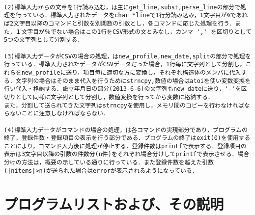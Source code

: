 \documentclass[a4j]{jarticle}
\begin{document}
\begin{verbatim}

(2)標準入力からの文章を1行読み込む，は主にget_line,subst,perse_lineの部分で処理を行っている．標準入力されたデータをchar *lineで1行分読み込み，1文字目が%であれば2文字目以降のコマンドと引数を別関数の引数とし，各コマンドに応じた処理を行う．また，１文字目が％でない場合はこの1行をCSV形式の文とみなし，カンマ ',' を区切りとして5つの文字列として分割する．

(3)標準入力データがCSVの場合の処理，はnew_profile,new_date,splitの部分で処理を行っている．標準入力されたデータがCSVデータだった場合，1行毎に文字列として分割し，これらをnew_profileに送り，項目毎に適切な方に変換し，それぞれ構造体のメンバに代入する．文字列の場合はそのまま代入を行うためにstrncpy,数値の場合はatoiを使い変数変換を行い代入・格納する．設立年月日の部分(2013-6-6)の文字列もnew_dateに送り，'-'を区切りとして同様に文字列として分割し，数値変換を行ってから変数に格納する．
また，分割して送られてきた文字列はstrncpyを使用し，メモリ間のコピーを行わなければならないことに注意しなければならない．

(4)標準入力データがコマンドの場合の処理，は各コマンドの実現部分であり，プログラムの終了，登録件数・登録項目の表示を行う部分である．プログラムの終了はexit(0)を使用することにより，コマンド入力後に処理が停止する．登録件数はprintfで表示する．登録項目の表示は3文字目以降の引数の件数分(n件)をそれぞれ場合分けしてprintfで表示させる．場合分けの方法は，概要の示している通りに行っている．また登録件数を越えた引数(|nitems|>n)が送られた場合はerrorが表示されるようになっている．

\end{verbatim}

%
%

\section{プログラムリストおよび、その説明}
\end{document}
